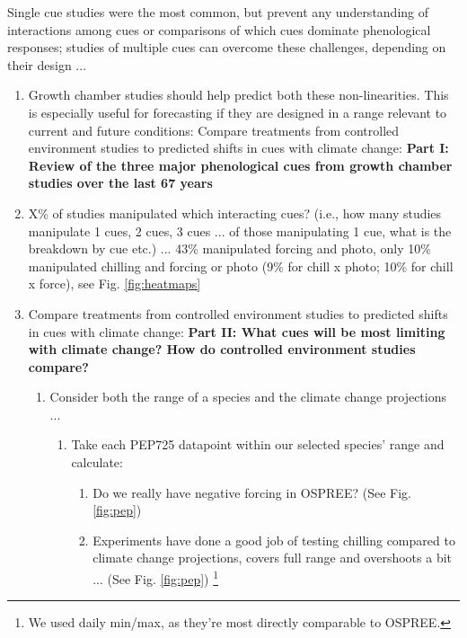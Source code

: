 \documentclass[11pt,letter]{article}
\begin{document}
Single cue studies were the most common, but prevent any understanding of interactions among cues or comparisons of which cues dominate phenological responses; studies of multiple cues can overcome these challenges, depending on their design ... 

\begin{enumerate}
\item Growth chamber studies should help predict both these non-linearities. This is especially useful for forecasting if they are designed in a range relevant to current and future conditions: Compare treatments from controlled environment studies to predicted shifts in cues with climate change: {\bf Part I: Review of the three major phenological cues from growth chamber studies over the last 67 years} %
\item X\% of studies manipulated which interacting cues? (i.e., how many studies manipulate 1 cues, 2 cues, 3 cues ... of those manipulating 1 cue, what is the breakdown by cue etc.) ... 43\% manipulated forcing and photo, only 10\% manipulated chilling and forcing or photo (9\% for chill x photo; 10\% for chill x force), see Fig. \ref{fig:heatmaps}
\item Compare treatments from controlled environment studies to predicted shifts in cues with climate change: {\bf Part II: What cues will be most limiting with climate change? How do controlled environment studies compare?}
\begin{enumerate}
\item Consider both the range of a species and the climate change projections ...
\begin{enumerate}
\item Take each PEP725 datapoint within our selected species' range and calculate:
\begin{enumerate}
\item Do we really have negative forcing in OSPREE? (See Fig. \ref{fig:pep})
\item Experiments have done a good job of testing chilling compared to climate change projections, covers full range and overshoots a bit ... (See Fig. \ref{fig:pep}) \footnote{We used daily min/max, as they're most directly comparable to OSPREE.}
\end{enumerate}
\end{enumerate}
\end{enumerate}
\end{enumerate}
\end{document}
